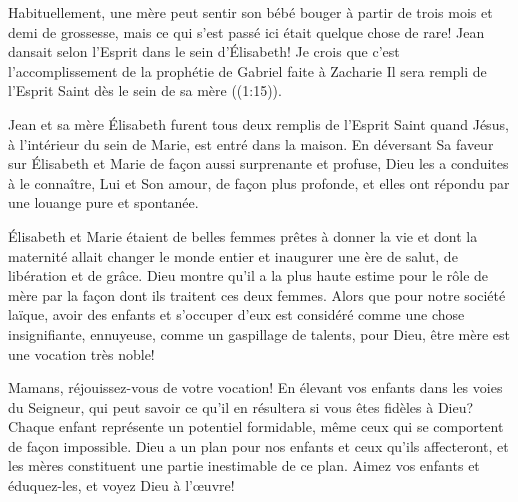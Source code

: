 


Habituellement, une mère peut sentir son bébé bouger à partir de trois mois et demi de grossesse, mais ce qui s'est passé ici était quelque chose de rare! Jean dansait selon l'Esprit dans le sein d'Élisabeth! Je crois que c'est l'accomplissement de la prophétie de Gabriel faite à Zacharie\frcolon{} \Og Il sera rempli de l’Esprit Saint dès le sein de sa mère \Fg{} ((1:15)).

Jean et sa mère Élisabeth furent tous deux remplis de l'Esprit Saint quand Jésus, à l'intérieur du sein de Marie, est entré dans la maison. En déversant Sa faveur sur Élisabeth et Marie de façon aussi surprenante et profuse, Dieu les a conduites à le connaître, Lui et Son amour, de façon plus profonde, et elles ont répondu par une louange pure et spontanée.

Élisabeth et Marie étaient de belles femmes prêtes à donner la vie et dont la maternité allait changer le monde entier et inaugurer une ère de salut, de libération et de grâce. Dieu montre qu'il a la plus haute estime pour le rôle de mère par la façon dont ils traitent ces deux femmes. Alors que pour notre société laïque, avoir des enfants et s'occuper d'eux est considéré comme une chose insignifiante, ennuyeuse, comme un gaspillage de talents, pour Dieu, être mère est une vocation très noble!

Mamans, réjouissez-vous de votre vocation! En élevant vos enfants dans les voies du Seigneur, qui peut savoir ce qu'il en résultera si vous êtes fidèles à Dieu? Chaque enfant représente un potentiel formidable, même ceux qui se comportent de façon impossible. Dieu a un plan pour nos enfants et ceux qu'ils affecteront, et les mères constituent une partie inestimable de ce plan. Aimez vos enfants et éduquez-les, et voyez Dieu à l'œuvre!


